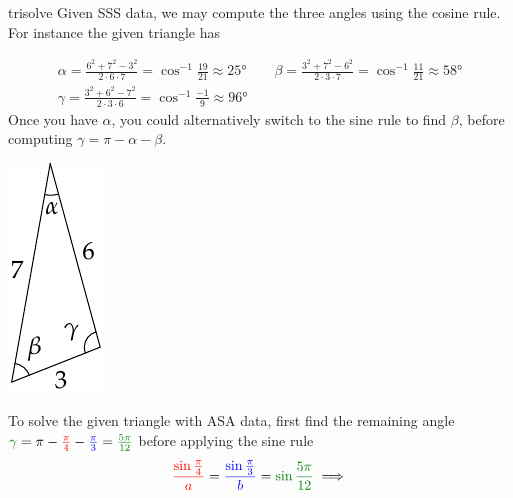 \begin{examples}{}{trisolve}
	\exstart Given SSS data, we may compute the three angles using the cosine rule. For instance the given triangle has
	\begin{enumerate}\setcounter{enumi}{1}
		\begin{minipage}[t]{0.86\linewidth}\vspace{-13pt}
		  \item[]
		  \begin{gather*}
				\alpha=\frac{6^2+7^2-3^2}{2\cdot 6\cdot 7}=\cos^{-1}\frac{19}{21}\approx\ang{25}\qquad
				\beta=\frac{3^2+7^2-6^2}{2\cdot 3\cdot 7}=\cos^{-1}\frac{11}{21}\approx\ang{58}\\[5pt]
				\gamma=\frac{3^2+6^2-7^2}{2\cdot 3\cdot 6}=\cos^{-1}\frac{-1}{9}\approx\ang{96}
			\end{gather*}
			Once you have $\alpha$, you could alternatively switch to the sine rule to find $\beta$, before computing $\gamma=\pi-\alpha-\beta$.
		\end{minipage}\hfill\begin{minipage}[t]{0.13\linewidth}\vspace{-24pt}
			\flushright\includegraphics[scale=0.95]{angles-ssssolve}
		\end{minipage}\smallbreak
		\begin{minipage}[t]{0.75\linewidth}\vspace{0pt}
			\item\label{ex:trisolve2} To solve the given triangle with ASA data, first find the remaining angle $\textcolor{Green}{\gamma}=\pi-\textcolor{red}{\frac\pi 4}-\textcolor{blue}{\frac\pi 3} =\textcolor{Green}{\frac{5\pi}{12}}$ before applying the sine rule
		  \begin{align*}
		  	\textcolor{red}{\frac{\sin\frac\pi 4}a} 
		  		=\textcolor{blue}{\frac{\sin\frac\pi 3}b} 
		  		=\textcolor{Green}{\sin\frac{5\pi}{12}}%
		  		\implies 

\end{align*}
\end{minipage}
\end{enumerate}
\end{examples}
